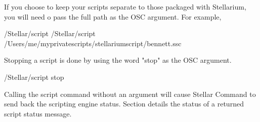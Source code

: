 If you choose to keep your scripts separate to those packaged with Stellarium, you will need o pass the full path as the OSC argument. For example, 
	\medskip
\begin{syntax}	
	\medskip
	/Stellar/script /Stellar/script /Users/me/myprivatescripts/stellariumscript/bennett.ssc
	\medskip
\end{syntax}  
	\medskip
Stopping a script is done by using the word "stop" as the OSC argument. 
	\medskip
\begin{syntax}	
	\medskip
	/Stellar/script stop
	\medskip
\end{syntax}  
	\medskip
Calling the script command without an argument will cause Stellar Command to send back the scripting engine status. Section  details the status of a returned script status message.